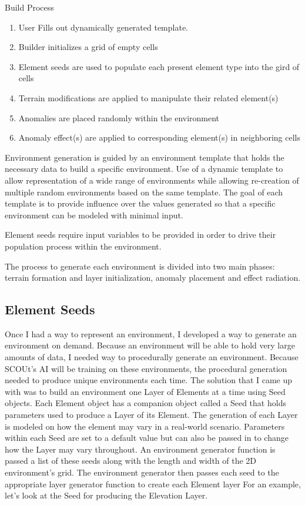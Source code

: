 Build Process
\begin{enumerate}
  \item User Fills out dynamically generated template. 
  \item	Builder initializes a grid of empty cells
  \item	Element seeds are used to populate each present element type into the gird of cells
  \item	Terrain modifications are applied to manipulate their related element(s)
  \item	Anomalies are placed randomly within the environment
  \item	Anomaly effect(s) are applied to corresponding element(s) in neighboring cells
\end{enumerate}

Environment generation is guided by an environment template that holds the necessary data to build a specific environment. 
Use of a dynamic template to allow representation of a wide range of environments while allowing re-creation of multiple random environments based on the same template.
The goal of each template is to provide influence over the values generated so that a specific environment can be modeled with minimal input.

Element seeds require input variables to be provided in order to drive their population process within the environment.

The process to generate each environment is divided into two main phases: terrain formation and layer initialization, anomaly placement and effect radiation.


\subsection{Element Seeds}
Once I had a way to represent an environment, I developed a way to generate an environment on demand.
Because an environment will be able to hold very large amounts of data, I needed way to procedurally generate an environment.
Because SCOUt’s AI will be training on these environments, the procedural generation needed to produce unique environments each time.
The solution that I came up with was to build an environment one Layer of Elements at a time using Seed objects.
Each Element object has a companion object called a Seed that holds parameters used to produce a Layer of its Element.
The generation of each Layer is modeled on how the element may vary in a real-world scenario.
Parameters within each Seed are set to a default value but can also be passed in to change how the Layer may vary throughout.
An environment generator function is passed a list of these seeds along with the length and width of the 2D environment’s grid.
The environment generator then passes each seed to the appropriate layer generator function to create each Element layer
For an example, let’s look at the Seed for producing the Elevation Layer.

